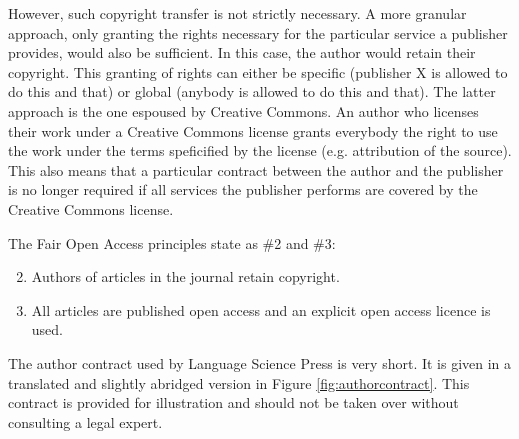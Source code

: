 \documentclass[guidelines,nonflat,modfonts] {langsci/langscibook}
\begin{document}
However, such copyright transfer is not strictly necessary. A more granular approach, only granting the rights necessary for the particular service a publisher provides, would also be sufficient. In this case, the author would retain their copyright. This granting of rights can either be specific (publisher X is allowed to do this and that) or global (anybody is allowed to do this and that). The latter approach is the one espoused by Creative Commons. An author who licenses their work under a Creative Commons license grants everybody the right to use the work under the terms speficified by the license (e.g. attribution of the source). This also means that a particular contract between the author and the publisher is no longer required if all services the publisher performs are covered by the Creative Commons license. 

The Fair Open Access principles state as \#2 and \#3:

\begin{enumerate}
\setcounter{enumi}{1}
\item Authors of articles in the journal retain copyright.
\item All articles are published open access and an explicit open access licence is used.
\end{enumerate}

The author contract used by Language Science Press is very short. It is given in a translated and slightly abridged version in Figure \ref{fig:authorcontract}. This contract is provided for illustration and should not be taken over without consulting a legal expert.
\end{document}
